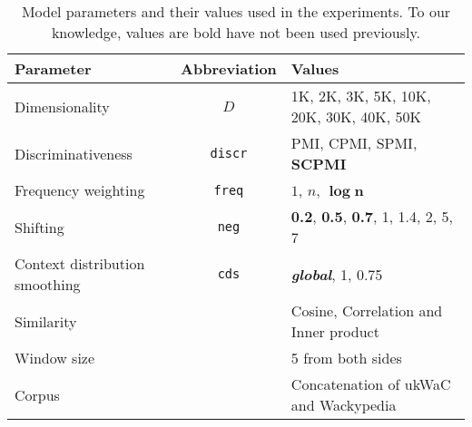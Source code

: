 \begin{table}
  \centering
  \small
  \begin{tabular}{lcl}
    \toprule
    Parameter           & Abbreviation   & Values \\
    \midrule
    Dimensionality      & $D$            & 1K, 2K, 3K, 5K, 10K, 20K, 30K, 40K, 50K \\
    Discriminativeness  & \texttt{discr} & PMI, CPMI, SPMI, \textbf{SCPMI} \\
    Frequency weighting & \texttt{freq}  & $1$, $n$, $\boldsymbol{\log n}$ \\
    Shifting            & \texttt{neg}   & \textbf{0.2}, \textbf{0.5}, \textbf{0.7}, 1, 1.4, 2, 5, 7 \\
    Context distribution smoothing       & \texttt{cds} & \textbf{\textit{global}}, 1, 0.75 \\
    Similarity          &                & Cosine, Correlation and Inner product \\
    \addlinespace
    Window size         &                & 5 from both sides                     \\
    Corpus              &                & Concatenation of ukWaC and Wackypedia \\
    \bottomrule
  \end{tabular}
  \caption{Model parameters and their values used in the experiments. To our knowledge, values are bold have not been used previously.}
\label{tab:parameters}
\end{table}

